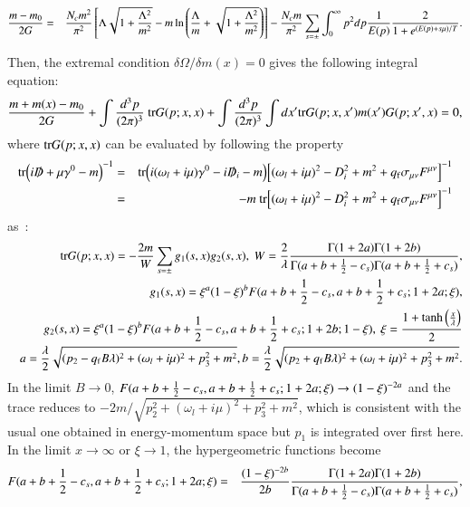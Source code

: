 \documentclass[aps,prd,amsmath,two column,amssymb,showpacs]{revtex4}
\begin{document}
\begin{widetext}
\begin{eqnarray}
{m-m_0\over 2G}&=&{N_c m^2\over\pi^2}\left[\Lambda\sqrt{1+{\Lambda^2\over m^2}}-m\ln\left({\Lambda\over m}
+\sqrt{1+{\Lambda^2\over m^2}}\right)\right]-{N_cm\over\pi^2}\sum_{s=\pm}\int_0^\infty p^2 dp {1\over E(p)}{2\over 1+e^{(E(p)+s\mu)/T}}.
\end{eqnarray}

Then, the extremal condition $\delta\Omega/\delta m(x)=0$ gives the following integral equation:
	\begin{eqnarray}\label{gap3}
	{m+m(x)-m_0\over2G}+\int{d^3p\over (2\pi)^3}~{\rm tr}G(p;x,x)+\int{d^3p\over (2\pi)^3}\int dx'{\rm tr}G(p;x,x')m(x')G(p;x',x)=0,
	\end{eqnarray}
where ${\rm tr}G(p;x,x)$ can be evaluated by following the property
\begin{eqnarray}
{\rm tr}\Big(i\slashed{D}+\mu\gamma^0-m\Big)^{-1}&=&{\rm tr}\Big(i(\omega_l+i\mu)\gamma^0-i\slashed{D}_i-m\Big)\Big[(\omega_l+i\mu)^2-D_i^2+m^2+q_{\rm f}\sigma_{\mu\nu}F^{\mu\nu}\Big]^{-1}\nonumber\\
&=&-m~{\rm tr}\Big[(\omega_l+i\mu)^2-D_i^2+m^2+q_{\rm f}\sigma_{\mu\nu}F^{\mu\nu}\Big]^{-1}
\end{eqnarray}
as~\cite{Cangemi:1995ee,Dunne:1997kw}:
\begin{eqnarray}
&&{\rm tr}G(p;x,x)=-{2m\over W}\sum_{s=\pm} {g_1(s,x)g_2(s,x)},\ W={2\over{\lambda}}{\Gamma(1+2a)\Gamma(1+2b)\over \Gamma(a+b+{1\over2}-c_s)\Gamma(a+b+{1\over2}+c_s)},\nonumber\\
&&g_1(s,x)=\xi^a(1-\xi)^bF(a+b+{1\over2}-c_s,a+b+{1\over2}+c_s;1+2a;\xi),\nonumber\\
&&g_2(s,x)=\xi^a(1-\xi)^bF(a+b+{1\over2}-c_s,a+b+{1\over2}+c_s;1+2b;1-\xi),\ \xi={1+\tanh\Big({x\over\lambda}\Big)\over2}\nonumber\\
&&a={\lambda\over2}\sqrt{(p_2-q_{\rm f}B\lambda)^2+(\omega_l+i\mu)^2+p_3^2+m^2},b={\lambda\over2}\sqrt{(p_2+q_{\rm f}B\lambda)^2+(\omega_l+i\mu)^2+p_3^2+m^2}.
\end{eqnarray}
In the limit $B\rightarrow0$, $F(a+b+{1\over2}-c_s,a+b+{1\over2}+c_s;1+2a;\xi)\rightarrow(1-\xi)^{-2a}$ and the trace reduces to $-2m/\sqrt{p_2^2+(\omega_l+i\mu)^2+p_3^2+m^2}$, which is consistent with the usual one obtained in energy-momentum space but $p_1$ is integrated over first here. In the limit $x\rightarrow\infty$ or $\xi\rightarrow1$, the hypergeometric functions become
\begin{eqnarray}
F(a+b+{1\over2}-c_s,a+b+{1\over2}+c_s;1+2a;\xi)&=&{(1-\xi)^{-2b}\over 2b}{\Gamma(1+2a)\Gamma(1+2b)\over \Gamma(a+b+{1\over2}-c_s)\Gamma(a+b+{1\over2}+c_s)},\nonumber\\

\end{eqnarray}
\end{widetext}
\end{document}

